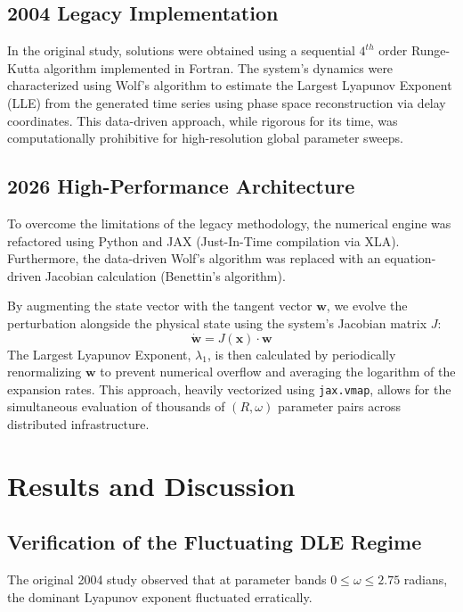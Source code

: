 \documentclass[11pt, a4paper]{article}
\begin{document}
\subsection{2004 Legacy Implementation}
In the original study, solutions were obtained using a sequential $4^{th}$ order Runge-Kutta algorithm implemented in Fortran. The system's dynamics were characterized using Wolf's algorithm to estimate the Largest Lyapunov Exponent (LLE) from the generated time series using phase space reconstruction via delay coordinates. This data-driven approach, while rigorous for its time, was computationally prohibitive for high-resolution global parameter sweeps.

\subsection{2026 High-Performance Architecture}
To overcome the limitations of the legacy methodology, the numerical engine was refactored using Python and JAX (Just-In-Time compilation via XLA). Furthermore, the data-driven Wolf's algorithm was replaced with an equation-driven Jacobian calculation (Benettin's algorithm).

By augmenting the state vector with the tangent vector $\mathbf{w}$, we evolve the perturbation alongside the physical state using the system's Jacobian matrix $J$:
\begin{equation}
\dot{\mathbf{w}} = J(\mathbf{x}) \cdot \mathbf{w}
\end{equation}
The Largest Lyapunov Exponent, $\lambda_1$, is then calculated by periodically renormalizing $\mathbf{w}$ to prevent numerical overflow and averaging the logarithm of the expansion rates. This approach, heavily vectorized using \texttt{jax.vmap}, allows for the simultaneous evaluation of thousands of $(R, \omega)$ parameter pairs across distributed infrastructure.

\section{Results and Discussion}
\label{sec:results}

\subsection{Verification of the Fluctuating DLE Regime}
The original 2004 study observed that at parameter bands $0 \le \omega \le 2.75$ radians, the dominant Lyapunov exponent fluctuated erratically. 
\end{document}
